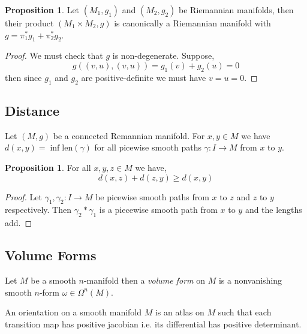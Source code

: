 \documentclass[12pt]{extarticle}
\theoremstyle{definition}
\newtheorem{proposition}[theorem]{Proposition}
\newenvironment{definition}[1][Definition:]{\begin{trivlist}
\item[\hskip \labelsep {\bfseries #1}]}{\end{trivlist}}
\begin{document}
\begin{proposition}
Let $(M_1, g_1)$ and $(M_2, g_2)$ be Riemannian manifolds, then their product $(M_1 \times M_2, g)$ is canonically a Riemannian manifold with $g = \pi_1^* g_1 + \pi_2^* g_2$. 
\end{proposition}

\begin{proof}
We must check that $g$ is non-degenerate. Suppose,
\[ g((v,u),(v,u)) = g_1(v) + g_2(u) = 0\]
then since $g_1$ and $g_2$ are positive-definite we must have $v = u = 0$. 
\end{proof}

\subsection{Distance}

\newcommand{\len}[1]{\mathrm{len}\left( #1 \right)}

\begin{definition}
Let $(M, g)$ be a connected Remannian manifold. For $x,y \in M$ we have $d(x,y) = \inf{\len{\gamma}}$ for all picewise smooth paths $\gamma : I \to M$ from $x$ to $y$. 
\end{definition}

\begin{proposition}
For all $x,y,z \in M$ we have,
\[ d(x,z) + d(z, y) \ge d(x, y) \]
\end{proposition}

\begin{proof}
Let $\gamma_1, \gamma_2 : I \to M$ be picewise smooth paths from $x$ to $z$ and $z$ to $y$ respectively. Then $\gamma_2 * \gamma_1$ is a piecewise smooth path from $x$ to $y$ and the lengths add.
\end{proof}

\subsection{Volume Forms}

\begin{definition}
Let $M$ be a smooth $n$-manifold then a \textit{volume form} on $M$ is a nonvanishing smooth $n$-form $\omega \in \Omega^n(M)$.  
\end{definition}

\begin{definition}
An orientation on a smooth manifold $M$ is an atlas on $M$ such that each transition map has positive jacobian i.e. its differential has positive determinant. 
\end{definition}
\end{document}
